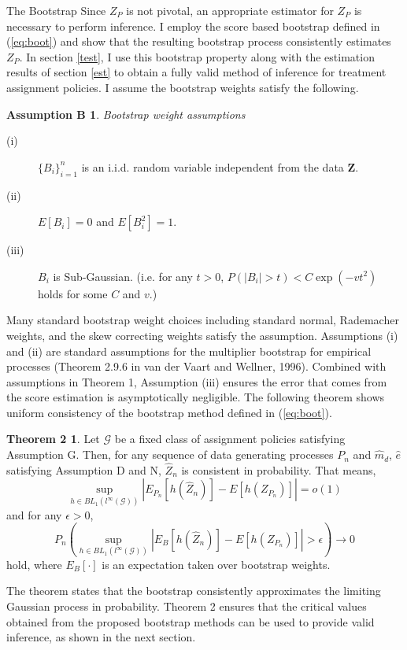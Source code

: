 \documentclass[12pt,oneside,reqno,english]{amsart}
\makeatletter
\renewcommand\subsection{\@startsection{subsection}{2}%
  \z@{-.5\linespacing\@plus-.7\linespacing}{.5\linespacing}%
  {\normalfont\scshape}}
\theoremstyle{definition}
\newtheorem*{thm2}{Theorem 2}
\newtheorem*{asmB}{Assumption B}
\makeatother
\begin{document}
\subsection{The Bootstrap}\label{boot}
Since $Z_{P}$ is not pivotal, an appropriate estimator for $Z_{P}$ is necessary to perform inference. 
I employ the score based bootstrap defined in (\ref{eq:boot}) and show that the resulting bootstrap process consistently estimates $Z_{P}$. 
In section \ref{test}, I use this bootstrap property along with the estimation results of section \ref{est} to obtain a fully valid method of inference for treatment assignment policies.  I assume the bootstrap weights satisfy the following.
\begin{asmB} \textit{Bootstrap weight assumptions}
\begin{description}
    \item[{(i)}] $\{B_{i}\}_{i=1}^{n}$ is an i.i.d. random variable independent from the data $\mathbf{Z}$. 
    \item[{(ii)}] $E[B_{i}]=0$ and $E[B_{i}^{2}]=1$.
    \item[{(iii)}] $B_{i}$ is Sub-Gaussian. (i.e. for any $t>0$, $P(|B_{i}|>t)<C\exp(-vt^{2})$ holds for some $C$ and $v$.)  
\end{description}
\end{asmB}
Many standard bootstrap weight choices including standard normal, Rademacher weights, and the skew correcting weights \citep{Mammen:93} satisfy the assumption. 
Assumptions (i) and (ii) are standard assumptions for the multiplier bootstrap for empirical processes (Theorem 2.9.6 in van der Vaart and Wellner, 1996). 
Combined with assumptions in Theorem 1, Assumption (iii) ensures the error that comes from the score estimation is asymptotically negligible. 
The following theorem shows uniform consistency of the bootstrap method defined in (\ref{eq:boot}). 
\begin{thm2}
Let $\mathcal{G}$ be a fixed class of assignment policies satisfying Assumption G.  
Then, for any sequence of data generating processes $P_{n}$ and $\hat{m}_{d}$, $\hat{e}$ satisfying Assumption D and N, $\hat{Z}_{n}$ is consistent in probability. That 
means, 
\[\sup_{h\in BL_{1}(l^{\infty}(\mathcal{G}))}|E_{P_{n}}[h(\hat{Z}_{n})]-E[h(Z_{P_{n}})]|=o(1)\]
and for any $\epsilon>0$,
\[P_{n}(\sup_{h\in BL_{1}(l^{\infty}(\mathcal{G}))}|E_{B}[h(\hat{Z}_{n})]-E[h(Z_{P_{n}})]|>\epsilon)\rightarrow 0\]
hold, where $E_{B}[\cdot]$ is an expectation taken over bootstrap weights.
\end{thm2}
The theorem states that the bootstrap consistently approximates the limiting Gaussian process in probability. Theorem 2 ensures that the critical values obtained from the 
proposed bootstrap methods can be used to provide valid inference, as shown in the next section. 
\end{document}
